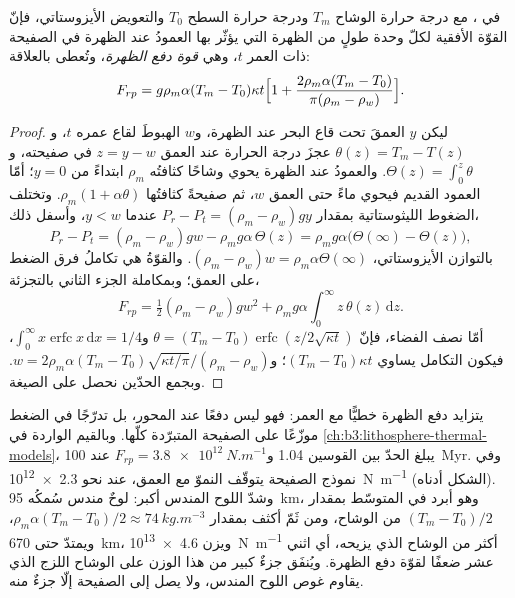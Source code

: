\begin{proposition}\label{prop:b3:mantle-convection:ridge-push}
في ، مع درجة حرارة الوشاح $T_m$ ودرجة حرارة السطح
$T_0$ والتعويض الأيزوستاتي، فإنّ القوّة الأفقية لكلّ وحدة
طولٍ من الظهرة التي يؤثّر بها العمودُ عند الظهرة في الصفيحة ذات العمر $t$،
وهي \emph{قوة دفع الظهرة}، وتُعطى بالعلاقة:
\[
  F_{rp} = g\rho_m\alpha(T_m - T_0)\kappa t\Bigl[1 + \frac{2\rho_m\alpha(T_m
  - T_0)}{\pi(\rho_m - \rho_w)}\Bigr].
\]
\end{proposition}

\begin{proof}
ليكن $y$ العمقَ تحت قاع البحر عند الظهرة، و$w$ الهبوطَ
لقاع عمره $t$، و$\theta(z) = T_m - T(z)$ عجزَ درجة الحرارة عند
العمق $z = y - w$ في صفيحته، و$\Theta(z) = \int_0^z\theta$. والعمودُ عند الظهرة
يحوي وشاحًا كثافتُه $\rho_m$ ابتداءً من $y = 0$؛ أمّا العمود القديم فيحوي
ماءً حتى العمق $w$، ثم صفيحةً كثافتُها $\rho_m(1 + \alpha\theta)$.
وتختلف الضغوط الليثوستاتية بمقدار $P_r - P_t = (\rho_m - \rho_w)gy$ عندما $y < w$،
وأسفل ذلك،
\[
  P_r - P_t = (\rho_m - \rho_w)gw - \rho_mg\alpha\,\Theta(z)
  = \rho_mg\alpha\bigl(\Theta(\infty) - \Theta(z)\bigr),
\]
بالتوازن الأيزوستاتي، $(\rho_m - \rho_w)w = \rho_m\alpha\Theta(\infty)$. والقوّةُ هي
تكاملُ فرق الضغط على العمق؛ وبمكاملة الجزء الثاني
بالتجزئة،
\[
  F_{rp} = \tfrac12(\rho_m - \rho_w)gw^2 + \rho_mg\alpha\int_0^\infty
  z\,\theta(z)\,\mathrm dz .
\]
أمّا نصف الفضاء، فإنّ $\theta = (T_m - T_0)\operatorname{erfc}(z/2\sqrt{\kappa
t})$ و$\int_0^\infty x\operatorname{erfc}x\,\mathrm dx = 1/4$، فيكون التكامل
يساوي $(T_m - T_0)\kappa t$؛ و$w = 2\rho_m\alpha(T_m -
T_0)\sqrt{\kappa t/\pi}/(\rho_m - \rho_w)$. وبجمع الحدّين نحصل على
الصيغة.
\end{proof}

يتزايد دفع الظهرة خطيًّا مع العمر: فهو ليس دفعًا عند المحور، بل
تدرّجًا في الضغط موزّعًا على الصفيحة المتبرّدة كلّها. وبالقيم الواردة في
\cref{ch:b3:lithosphere-thermal-models}، يبلغ الحدّ بين القوسين 1.04 و$F_{rp} =
\qty{3.8e12}{N.m^{-1}}$ عند \qty{100}{Myr}. وفي نموذج الصفيحة يتوقّف النموّ
مع العمق، عند نحو \qty{2.3e12}{N.m^{-1}} (الشكل أدناه). وشدّ اللوح المندس
أكبر: لوحٌ مندس سُمكُه \qty{95}{km}، وهو أبرد في المتوسّط بمقدار $(T_m - T_0)/2$ من
الوشاح، ومن ثَمّ أكثف بمقدار $\rho_m\alpha(T_m - T_0)/2 \approx
\qty{74}{kg.m^{-3}}$، ويمتدّ حتى \qty{670}{km}، ويزن
\qty{4.6e13}{N.m^{-1}} أكثر من الوشاح الذي يزيحه، أي اثني عشر ضعفًا
لقوّة دفع الظهرة. ويُنفَق جزءٌ كبير من هذا الوزن على الوشاح اللزج الذي يقاوم
غوص اللوح المندس، ولا يصل إلى الصفيحة إلّا جزءٌ منه.

